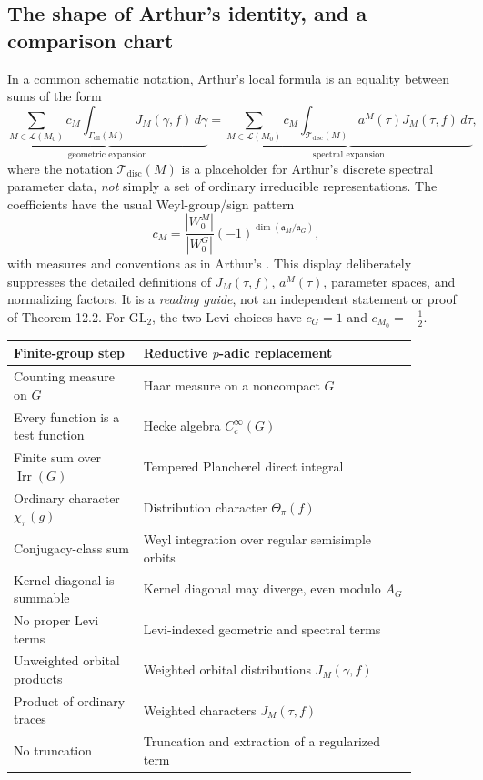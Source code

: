 \documentclass[12pt]{article}
\theoremstyle{remark}
\newcommand{\Irr}{\operatorname{Irr}}
\begin{document}
\subsection{The shape of Arthur's identity, and a comparison chart}
In a common schematic notation, Arthur's local formula is an
equality between sums of the form
\begin{equation}\label{eq:arthur-schematic}
 \underbrace{\sum_{M\in\mathcal L(M_0)} c_M
 \int_{\Gamma_{\mathrm{ell}}(M)}
 J_M(\gamma,f)\,d\gamma}_{\text{geometric expansion}}
 =
 \underbrace{\sum_{M\in\mathcal L(M_0)} c_M
 \int_{\mathscr T_{\mathrm{disc}}(M)}
 a^M(\tau)J_M(\tau,f)\,d\tau}_{\text{spectral expansion}},
\end{equation}
where the notation $\mathscr T_{\mathrm{disc}}(M)$ is a placeholder
for Arthur's discrete spectral parameter data, \emph{not} simply a
set of ordinary irreducible representations. The coefficients have
the usual Weyl-group/sign pattern
\[
 c_M=\frac{|W_0^M|}{|W_0^G|}
             (-1)^{\dim(\mathfrak a_M/\mathfrak a_G)},
\]
with measures and conventions as in Arthur's
\cite[Theorem 12.2]{ArthurLocal1991}.  This display deliberately
suppresses the detailed definitions of $J_M(\tau,f)$,
$a^M(\tau)$, parameter spaces, and normalizing factors. It is a
\emph{reading guide}, not an independent statement or proof of
Theorem 12.2. For $\mathrm{GL}_2$, the two Levi choices have
$c_G=1$ and $c_{M_0}=-\tfrac12$.

\begin{center}
\small
\begin{tabular}{@{}p{0.29\linewidth}p{0.59\linewidth}@{}}
\toprule
Finite-group step & Reductive $p$-adic replacement\\
\midrule
Counting measure on $G$ & Haar measure on a noncompact $G$\\
Every function is a test function & Hecke algebra $C_c^\infty(G)$\\
Finite sum over $\Irr(G)$ & Tempered Plancherel direct integral\\
Ordinary character $\chi_\pi(g)$ & Distribution character $\Theta_\pi(f)$\\
Conjugacy-class sum & Weyl integration over regular semisimple orbits\\
Kernel diagonal is summable & Kernel diagonal may diverge, even modulo $A_G$\\
No proper Levi terms & Levi-indexed geometric and spectral terms\\
Unweighted orbital products & Weighted orbital distributions $J_M(\gamma,f)$\\
Product of ordinary traces & Weighted characters $J_M(\tau,f)$\\
No truncation & Truncation and extraction of a regularized term\\
\bottomrule
\end{tabular}
\end{center}
\end{document}
